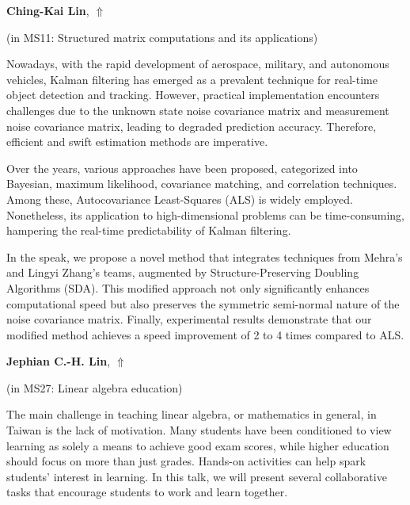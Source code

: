 \documentclass[ILAS2025-program.tex]{subfiles}
\begin{document}
\hypertarget{down0236}{}\begin{ilasabstract}
    
\textbf{Ching-Kai Lin},  \hfill \hyperlink{up0236}{$\Uparrow$}
    
    
(in {\color{mstitle}MS11: Structured matrix computations and its applications})
        
\mtskip
    Nowadays, with the rapid development of aerospace, military, and autonomous vehicles, Kalman filtering has emerged as a prevalent technique for real-time object detection and tracking. However, practical implementation encounters challenges due to the unknown state noise covariance matrix and measurement noise covariance matrix, leading to degraded prediction accuracy. Therefore, efficient and swift estimation methods are imperative.

Over the years, various approaches have been proposed, categorized into Bayesian, maximum likelihood, covariance matching, and correlation techniques. Among these, Autocovariance Least-Squares (ALS) is widely employed. Nonetheless, its application to high-dimensional problems can be time-consuming, hampering the real-time predictability of Kalman filtering.

In the speak, we propose a novel method that integrates techniques from Mehra's and Lingyi Zhang's teams, augmented by Structure-Preserving Doubling Algorithms (SDA). This modified approach not only significantly enhances computational speed but also preserves the symmetric semi-normal nature of the noise covariance matrix. Finally, experimental results demonstrate that our modified method achieves a speed improvement of 2 to 4 times compared to ALS.
\end{ilasabstract}
    

\hypertarget{down0261}{}\begin{ilasabstract}
    
\textbf{Jephian C.-H. Lin},  \hfill \hyperlink{up0261}{$\Uparrow$}
    
    
(in {\color{mstitle}MS27: Linear algebra education})
        
\mtskip
    The main challenge in teaching linear algebra, or mathematics in general, in Taiwan is the lack of motivation. Many students have been conditioned to view learning as solely a means to achieve good exam scores, while higher education should focus on more than just grades. Hands-on activities can help spark students' interest in learning. In this talk, we will present several collaborative tasks that encourage students to work and learn together.

\end{ilasabstract}
    
\end{document}

